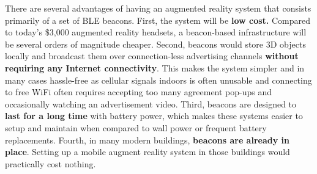 There are several advantages of having an augmented reality system that consists primarily of a set of BLE beacons. First, the system will be \textbf{low cost.} Compared to today's \$3,000 augmented reality headsets, a beacon-based infrastructure will be several orders of magnitude cheaper. Second, beacons would store 3D objects locally and broadcast them over connection-less advertising channels \textbf{without requiring any Internet connectivity}. This makes the system simpler and in many cases hassle-free as cellular signals indoors is often unusable and connecting to free WiFi often requires accepting too many agreement pop-ups and occasionally watching an advertisement video. Third, beacons are designed to \textbf{last for a long time} with battery power, which makes these systems easier to setup and maintain when compared to wall power or frequent battery replacements. Fourth, in many modern buildings, \textbf{beacons are already in place}. Setting up a mobile augment reality system in those buildings would practically cost nothing.





